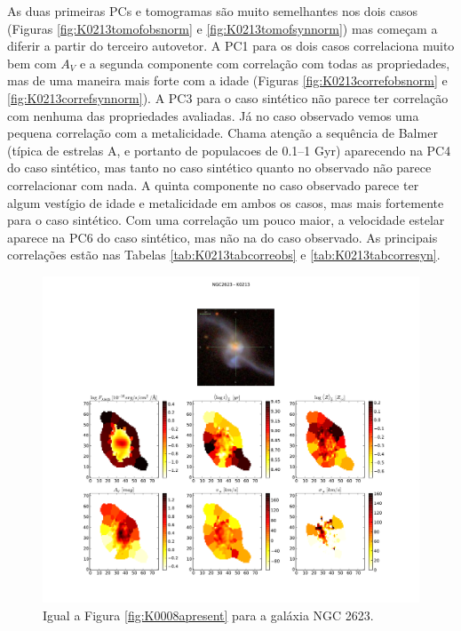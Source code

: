 As duas primeiras PCs e tomogramas são muito semelhantes nos dois casos (Figuras \ref{fig:K0213tomofobsnorm} e
\ref{fig:K0213tomofsynnorm}) mas começam a diferir a partir do terceiro autovetor. A PC1 para os dois casos correlaciona
muito bem com $A_V$ e a segunda componente com correlação com todas as propriedades, mas de uma maneira mais forte com a
idade (Figuras \ref{fig:K0213correfobsnorm} e \ref{fig:K0213correfsynnorm}). A PC3 para o caso sintético não parece ter
correlação com nenhuma das propriedades avaliadas. Já no caso observado vemos uma pequena correlação com a metalicidade.
Chama atenção a sequência de Balmer (típica de estrelas A, e portanto de populacoes de 0.1--1 Gyr) aparecendo na PC4 do
caso sintético, mas tanto no caso sintético quanto no observado não parece correlacionar com nada. A quinta componente
no caso observado parece ter algum vestígio de idade e metalicidade em ambos os casos, mas mais fortemente para o caso
sintético. Com uma correlação um pouco maior, a velocidade estelar aparece na PC6 do caso sintético, mas não na do caso
observado. As principais correlações estão nas Tabelas \ref{tab:K0213tabcorreobs} e \ref{tab:K0213tabcorresyn}. 

\begin{figure}
    \includegraphics[width=1.\textwidth]{figuras/K0213-apresent.pdf}
    \caption[Propriedades f\'isicas da gal\'axia NGC 2623.]
    {Igual a Figura \ref{fig:K0008apresent} para a galáxia NGC 2623.}
    \label{fig:K0213apresent}
\end{figure}

